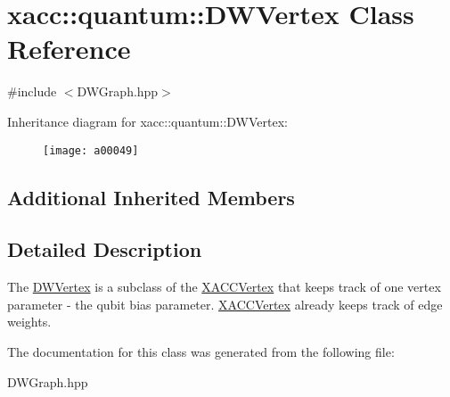 \hypertarget{a00049}{}\section{xacc\+:\+:quantum\+:\+:D\+W\+Vertex Class Reference}
\label{a00049}


{\ttfamily \#include $<$D\+W\+Graph.\+hpp$>$}

Inheritance diagram for xacc\+:\+:quantum\+:\+:D\+W\+Vertex\+:\begin{figure}[H]
\begin{center}
\leavevmode
\texttt{[image: a00049]}
\end{center}
\end{figure}
\subsection*{Additional Inherited Members}


\subsection{Detailed Description}
The \hyperlink{a00049}{D\+W\+Vertex} is a subclass of the \hyperlink{a00132}{X\+A\+C\+C\+Vertex} that keeps track of one vertex parameter -\/ the qubit bias parameter. \hyperlink{a00132}{X\+A\+C\+C\+Vertex} already keeps track of edge weights. 

The documentation for this class was generated from the following file\+:\begin{DoxyCompactItemize}
\item 
D\+W\+Graph.\+hpp\end{DoxyCompactItemize}
